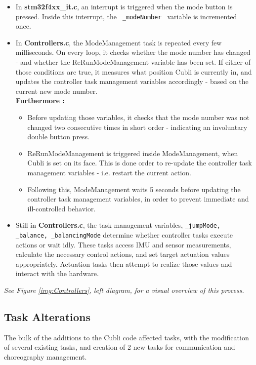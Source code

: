 \begin{itemize}
\item In \textbf{stm32f4xx\_it.c}, an interrupt is triggered when the mode button is pressed. Inside this interrupt, the \texttt{ \_modeNumber } variable is incremented once.

\item In \textbf{Controllers.c}, the ModeManagement task is repeated every few milliseconds. On every loop, it checks whether the mode number has changed - and whether the ReRunModeManagement variable has been set. If either of those conditions are true, it measures what position Cubli is currently in, and updates the controller task management variables accordingly - based on the current new mode number.\\

\textbf{Furthermore :} 
\begin{itemize}
\item[] Before updating those variables, it checks that the mode number was not changed two consecutive times in short order - indicating an involuntary double button press.
\item[] ReRunModeManagement is triggered inside ModeManagement, when Cubli is set on its face. This is done order to re-update the controller task management variables - i.e. restart the current action. 
\item[] Following this, ModeManagement waits 5 seconds before updating the controller task management variables, in order to prevent immediate and ill-controlled behavior.
\end{itemize}

\item Still in \textbf{Controllers.c}, the task management variables, \texttt{\_jumpMode, \_balance, \_balancingMode} determine whether controller tasks execute actions or wait idly. These tasks access IMU and sensor measurements, calculate the necessary control actions, and set target actuation values appropriately. Actuation tasks then attempt to realize those values and interact with the hardware.
\end{itemize}

\textit{See Figure \ref{img:Controllers}, left diagram, for a visual overview of this process.}


\subsection{Task Alterations}

The bulk of the additions to the Cubli code affected tasks, with the modification of several existing tasks, and creation of 2 new tasks for communication and choreography management.\\

